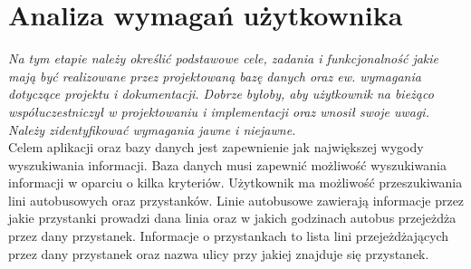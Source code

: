 \section{Analiza wymagań użytkownika}

\textit{Na tym etapie należy określić podstawowe
cele, zadania i funkcjonalność jakie mają być realizowane przez projektowaną bazę danych
oraz ew. wymagania dotyczące projektu i dokumentacji. Dobrze byłoby, aby użytkownik
na bieżąco współuczestniczył w projektowaniu i implementacji oraz wnosił swoje uwagi.
Należy zidentyfikować wymagania jawne i niejawne.} \\

Celem aplikacji oraz bazy danych jest zapewnienie jak największej wygody wyszukiwania informacji. Baza danych musi zapewnić możliwość wyszukiwania informacji w oparciu o kilka kryteriów. Użytkownik ma możliwość przeszukiwania lini autobusowych oraz przystanków. Linie autobusowe zawierają informacje przez jakie przystanki prowadzi dana linia oraz w jakich godzinach autobus przejeżdża przez dany przystanek. Informacje o przystankach to lista lini przejeżdżających przez dany przystanek oraz nazwa ulicy przy jakiej znajduje się przystanek.